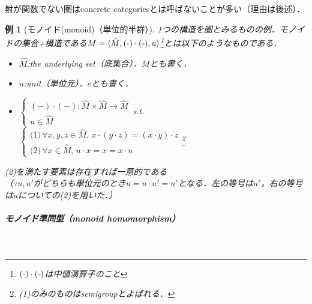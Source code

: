 \documentclass[dvipdfmx,a4j,10pt]{jsarticle}
\theoremstyle{mystyle1}
\theoremstyle{mystyle2}
\newtheorem{example}{例}
\theoremstyle{mystyle3}
\begin{document}
射が関数でない圏はconcrete categoriesとは呼ばないことが多い（理由は後述）．

\begin{example}[モノイド(monoid)（単位的半群）]
    1つの構造を圏とみるものの例．モノイドの集合+構造である$M=\langle \hat{M},(\mathchar`-)\cdot(\mathchar`-),u\rangle$\footnote{$(\mathchar`-)\cdot (\mathchar`-)$は中値演算子のこと}とは以下のようなものである．

    \begin{itemize}
        \item $\hat{M}$:the underlying set（底集合）．$M$とも書く．
        \item $u$:unit（単位元）．$e$とも書く．
        \item $\begin{cases}
                      (-)\cdot(-):\hat{M}\times\hat{M}\to\hat{M} \\
                      u\in\hat{M}
                  \end{cases}$\,\textrm{s.t.}\,
              $\begin{cases}
                      \textrm{(1)}\,\forall x,y,z\in\hat{M},\, x\cdot(y\cdot z)=(x\cdot y)\cdot z \\
                      \textrm{(2)}\,\forall x\in\hat{M},\, u\cdot x=x=x\cdot u
                  \end{cases}$\footnote{(1)のみのものはsemigroupとよばれる．}
    \end{itemize}
    (2)を満たす要素は存在すれば一意的である\\
    （$\because$$u,u'$がどちらも単位元のとき$u=u\cdot u'=u'$となる．左の等号は$u'$，右の等号は$u$についての(2)を用いた．）

        \subparagraph{モノイド準同型（monoid homomorphism）}\


\end{example}
\end{document}
